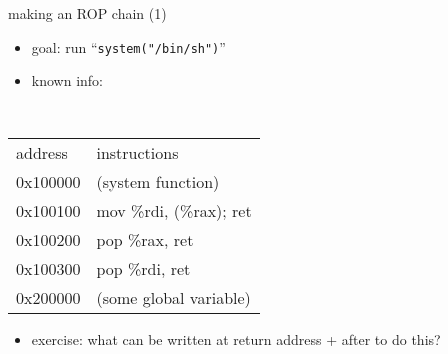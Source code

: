 

\begin{frame}[fragile,label=makerop1]{making an ROP chain (1)}
\begin{itemize}
    \item goal: run ``\texttt{system("/bin/sh")}''
    \item known info:
\end{itemize}
\small \tt
\begin{tabular}{ll}
\normalfont address & \normalfont instructions \\
0x100000 & (system function) \\
0x100100 & mov \%rdi, (\%rax); ret \\
0x100200 & pop \%rax, ret \\
0x100300 & pop \%rdi, ret \\
0x200000 & (some global variable) \\
\end{tabular}
\begin{itemize}
\item exercise: what can be written at return address + after to do this?
\end{itemize}
\end{frame}
